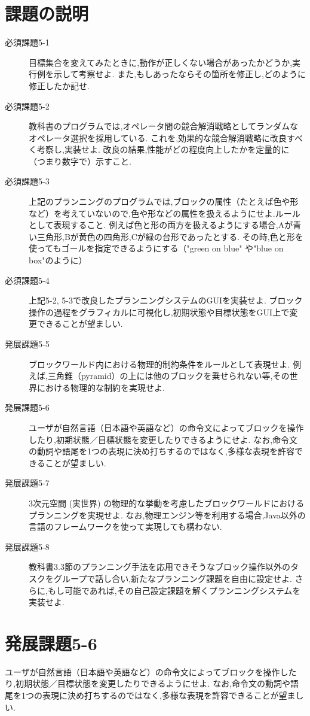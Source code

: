 \documentclass[uplatex,12pt]{jsarticle}
\begin{document}
\section{課題の説明}
\begin{description}
\item[必須課題5-1] 目標集合を変えてみたときに,動作が正しくない場合があったかどうか,実行例を示して考察せよ.
また,もしあったならその箇所を修正し,どのように修正したか記せ.
\item[必須課題5-2] 教科書のプログラムでは,オペレータ間の競合解消戦略としてランダムなオペレータ選択を採用している.
これを,効果的な競合解消戦略に改良すべく考察し,実装せよ.
改良の結果,性能がどの程度向上したかを定量的に（つまり数字で）示すこと.
\item[必須課題5-3] 上記のプランニングのプログラムでは,ブロックの属性（たとえば色や形など）を考えていないので,色や形などの属性を扱えるようにせよ.ルールとして表現すること.
例えば色と形の両方を扱えるようにする場合,Aが青い三角形,Bが黄色の四角形,Cが緑の台形であったとする.
その時,色と形を使ってもゴールを指定できるようにする（"green on blue" や"blue on box"のように）
\item[必須課題5-4] 上記5-2, 5-3で改良したプランニングシステムのGUIを実装せよ.
ブロック操作の過程をグラフィカルに可視化し,初期状態や目標状態をGUI上で変更できることが望ましい.
\item[発展課題5-5] ブロックワールド内における物理的制約条件をルールとして表現せよ.
例えば,三角錐（pyramid）の上には他のブロックを乗せられない等,その世界における物理的な制約を実現せよ.
\item[発展課題5-6] ユーザが自然言語（日本語や英語など）の命令文によってブロックを操作したり,初期状態／目標状態を変更したりできるようにせよ.
なお,命令文の動詞や語尾を1つの表現に決め打ちするのではなく,多様な表現を許容できることが望ましい.
\item[発展課題5-7] 3次元空間 (実世界) の物理的な挙動を考慮したブロックワールドにおけるプランニングを実現せよ.
なお,物理エンジン等を利用する場合,Java以外の言語のフレームワークを使って実現しても構わない.
\item[発展課題5-8] 教科書3.3節のプランニング手法を応用できそうなブロック操作以外のタスクをグループで話し合い,新たなプランニング課題を自由に設定せよ.
さらに,もし可能であれば,その自己設定課題を解くプランニングシステムを実装せよ.
\end{description}

\section{発展課題5-6}
\begin{screen}
ユーザが自然言語（日本語や英語など）の命令文によってブロックを操作したり,初期状態／目標状態を変更したりできるようにせよ.
なお,命令文の動詞や語尾を1つの表現に決め打ちするのではなく,多様な表現を許容できることが望ましい.
\end{screen}
\end{document}
